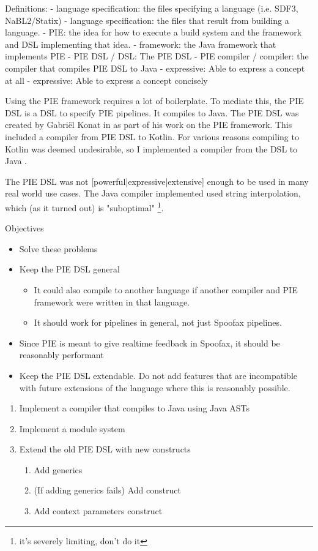 Definitions:
- language specification: the files specifying a language (i.e. SDF3, NaBL2/Statix)
- language specification: the files that result from building a language.
- PIE: the idea for how to execute a build system and the framework and DSL implementing that idea.
- framework: the Java framework that implements PIE
- PIE DSL / DSL: The PIE DSL
- PIE compiler / compiler: the compiler that compiles PIE DSL to Java
- expressive: Able to express a concept at all
- expressive: Able to express a concept concisely







Using the PIE framework requires a lot of boilerplate.
To mediate this, the PIE DSL is a DSL to specify PIE pipelines.
It compiles to Java.
The PIE DSL was created by Gabriël Konat in  as part of his work on the PIE framework.
This included a compiler from PIE DSL to Kotlin.
For various reasons compiling to Kotlin was deemed undesirable, so I implemented a compiler from the DSL to Java .

The PIE DSL was not [powerful|expressive|extensive] enough to be used in many real world use cases.
The Java compiler implemented used string interpolation, which (as it turned out) is "suboptimal" \footnote{it's severely limiting, don't do it}.


Objectives
\begin{itemize}
  \item Solve these problems
  \item Keep the PIE DSL general
  \begin{itemize}
    \item It could also compile to another language if another compiler and PIE framework were written in that language.
    \item It should work for pipelines in general, not just Spoofax pipelines.
  \end{itemize}
  \item Since PIE is meant to give realtime feedback in Spoofax, it should be reasonably performant
  \item Keep the PIE DSL extendable. Do not add features that are incompatible with future extensions of the language where this is reasonably possible.
\end{itemize}

\begin{enumerate}
  \item Implement a compiler that compiles to Java using Java ASTs
  \item Implement a module system
  \item Extend the old PIE DSL with new constructs
  \begin{enumerate}
    \item Add generics
    \item (If adding generics fails) Add  construct
    \item Add context parameters construct
  \end{enumerate}
\end{enumerate}

